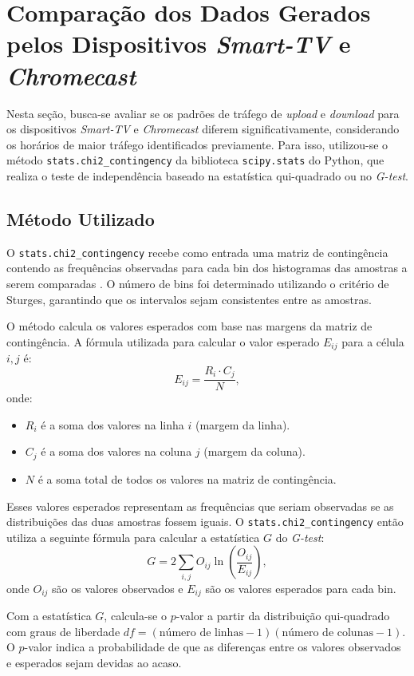 \section{Comparação dos Dados Gerados pelos Dispositivos \textit{Smart-TV} e \textit{Chromecast}}

Nesta seção, busca-se avaliar se os padrões de tráfego de \textit{upload} e \textit{download} para os dispositivos \textit{Smart-TV} e \textit{Chromecast} diferem significativamente, considerando os horários de maior tráfego identificados previamente. Para isso, utilizou-se o método \texttt{stats.chi2\_contingency} da biblioteca \texttt{scipy.stats} do Python, que realiza o teste de independência baseado na estatística qui-quadrado ou no \textit{G-test}.

\subsection{Método Utilizado}

O \texttt{stats.chi2\_contingency} recebe como entrada uma matriz de contingência contendo as frequências observadas para cada bin dos histogramas das amostras a serem comparadas \cite{scipy_chi2_contingency}. O número de bins foi determinado utilizando o critério de Sturges, garantindo que os intervalos sejam consistentes entre as amostras.

O método calcula os valores esperados com base nas margens da matriz de contingência. A fórmula utilizada para calcular o valor esperado \(E_{ij}\) para a célula \(i, j\) é:
\[
E_{ij} = \frac{R_i \cdot C_j}{N},
\]
onde:
\begin{itemize}
    \item \(R_i\) é a soma dos valores na linha \(i\) (margem da linha).
    \item \(C_j\) é a soma dos valores na coluna \(j\) (margem da coluna).
    \item \(N\) é a soma total de todos os valores na matriz de contingência.
\end{itemize}

Esses valores esperados representam as frequências que seriam observadas se as distribuições das duas amostras fossem iguais. O \texttt{stats.chi2\_contingency} então utiliza a seguinte fórmula para calcular a estatística \(G\) do \textit{G-test}:
\[
G = 2 \sum_{i,j} O_{ij} \ln\left(\frac{O_{ij}}{E_{ij}}\right),
\]
onde \(O_{ij}\) são os valores observados e \(E_{ij}\) são os valores esperados para cada bin.

Com a estatística \(G\), calcula-se o \(p\)-valor a partir da distribuição qui-quadrado com graus de liberdade \(df = (\text{número de linhas} - 1)(\text{número de colunas} - 1)\). O \(p\)-valor indica a probabilidade de que as diferenças entre os valores observados e esperados sejam devidas ao acaso.

